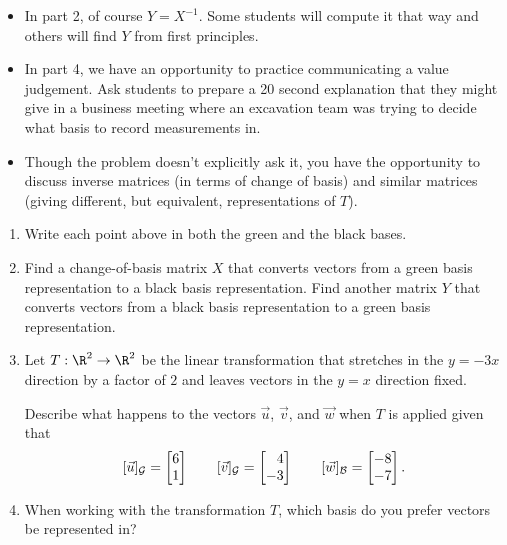 \documentclass{problemset}
\begin{document}
\begin{iola}
\begin{annotation}
\begin{notes}
			\begin{itemize}
				\item In part 2, of course $Y=X^{-1}$. Some students will
					compute it that way and others will find $Y$ from
					first principles.
				\item In part 4, we have an opportunity to practice communicating
					a value judgement. Ask students to prepare a 20 second explanation
					that they might give in a business meeting where an excavation
					team was trying to decide what basis to record measurements
					in.
				\item Though the problem doesn't explicitly ask it, you have the opportunity
					to discuss inverse matrices (in terms of change of basis) and similar
					matrices (giving different, but equivalent, representations of $T$).
			\end{itemize}
		\end{notes}
	\end{annotation}


\begin{enumerate}
	\item Write each point above in both the green and the black bases.
	\item Find a change-of-basis matrix $X$ that converts vectors from
		a green basis representation to a black basis representation. Find
		another matrix $Y$ that converts vectors from a black basis representation
		to a green basis representation.
	\item Let $T:\R^2\to\R^2$ be the linear transformation that stretches in the $y=-3x$ direction
		by a factor of $2$ and leaves vectors in the $y=x$ direction fixed.

		Describe what happens to the vectors $\vec u$, $\vec v$, and $\vec w$ when
		$T$ is applied given that
		\[
			[\vec u]_{\mathcal G} = \mat{6\\1} \qquad
			[\vec v]_{\mathcal G} = \mat{4\\-3} \qquad
			[\vec w]_{\mathcal B} = \mat{-8\\-7}.
		\]
	\item When working with the transformation $T$, which basis do you prefer vectors be
		represented in?
\end{enumerate}
\end{iola}
\end{document}
